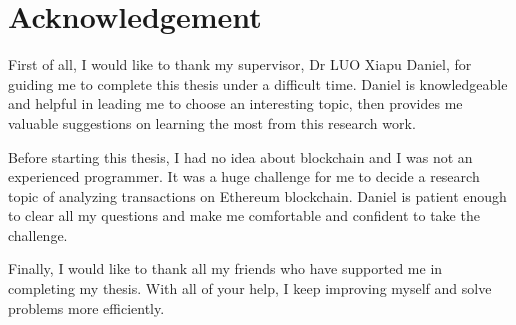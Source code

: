 %
\chapter*{Acknowledgement}
\label{sec:acknowledgement}
\vspace*{-10mm}

First of all, I would like to thank my supervisor, Dr LUO Xiapu Daniel, for guiding me to complete this thesis under a difficult time. Daniel is knowledgeable and helpful in leading me to choose an interesting topic, then provides me valuable suggestions on learning the most from this research work.

Before starting this thesis, I had no idea about blockchain and I was not an experienced programmer. It was a huge challenge for me to decide a research topic of analyzing transactions on Ethereum blockchain. Daniel is patient enough to clear all my questions and make me comfortable and confident to take the challenge.

Finally, I would like to thank all my friends who have supported me in completing my thesis. With all of your help, I keep improving myself and solve problems more efficiently.